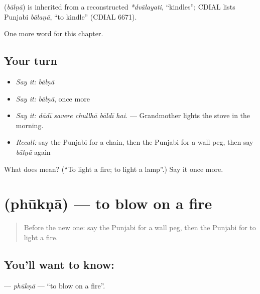 \begin{cousinweb}
\textbf{} (\emph{bālṇā}) is inherited from a reconstructed \emph{*dvālayati}, \textquotedblleft{}kindles\textquotedblright{}; CDIAL lists Punjabi \emph{bālaṇā}, \textquotedblleft{}to kindle\textquotedblright{} (CDIAL 6671).
\end{cousinweb}

\begin{grammarlens}[title={What you've built}]
One more word for this chapter.
\end{grammarlens}

\subsection*{Your turn}
\begin{itemize}
\raggedright
  \item \emph{Say it:} \emph{bālṇā}
  \item \emph{Say it:} \emph{bālṇā}, once more
  \item \emph{Say it:} \emph{dādī savere chullhā bāldī hai.} — Grandmother lights the stove in the morning.
  \item \emph{Recall:} say the Punjabi for a chain, then the Punjabi for a wall peg, then say \emph{bālṇā} again
\end{itemize}

\begin{tcolorbox}[breakable,colback=teal!4,colframe=teal!35!black,title={Before you move on}]
What does  mean? (\textquotedblleft{}To light a fire; to light a lamp\textquotedblright{}.) Say it once more.
\end{tcolorbox}
\section[\texorpdfstring{\pa{ਫੂਕਣਾ} (phūkṇā)}{ਫੂਕਣਾ (phūkṇā)}]{ (phūkṇā) — to blow on a fire}

\label{lesson:PA-C249-phukna}



\begin{quote}
Before the new one: say the Punjabi for a wall peg, then the Punjabi for to light a fire.
\end{quote}

\subsection*{You'll want to know: }
\textbf{} — \emph{phūkṇā} — \textquotedblleft{}to blow on a fire\textquotedblright{}.

